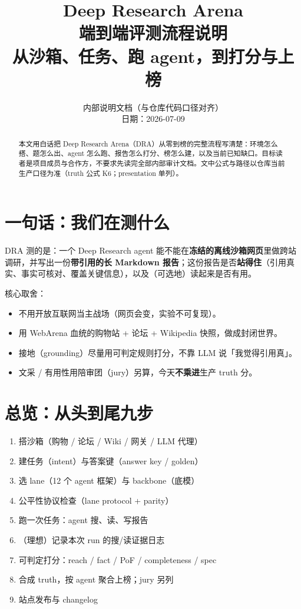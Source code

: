 \documentclass[11pt,a4paper]{article}
\title{\textbf{Deep Research Arena}\\[0.4em]
\large 端到端评测流程说明\\[0.3em]
\normalsize 从沙箱、任务、跑 agent，到打分与上榜}
\author{内部说明文档（与仓库代码口径对齐）\\日期：2026-07-09}
\date{}
\begin{document}
\maketitle
\tableofcontents
\newpage

\begin{abstract}
本文用白话把 Deep Research Arena（DRA）从零到榜的完整流程写清楚：环境怎么搭、题怎么出、agent 怎么跑、报告怎么打分、榜怎么建，以及当前已知缺口。目标读者是项目成员与合作方，不要求先读完全部内部审计文档。文中公式与路径以仓库当前生产口径为准（truth 公式 K6；presentation 单列）。
\end{abstract}

\section{一句话：我们在测什么}

DRA 测的是：一个 Deep Research agent 能不能在\textbf{冻结的离线沙箱网页}里做跨站调研，并写出一份\textbf{带引用的长 Markdown 报告}；这份报告是否\textbf{站得住}（引用真实、事实可核对、覆盖关键信息），以及（可选地）读起来是否有用。

核心取舍：
\begin{itemize}[leftmargin=1.5em]
  \item 不用开放互联网当主战场（网页会变，实验不可复现）。
  \item 用 WebArena 血统的购物站 + 论坛 + Wikipedia 快照，做成封闭世界。
  \item 接地（grounding）尽量用可判定规则打分，不靠 LLM 说「我觉得引用真」。
  \item 文采 / 有用性用陪审团（jury）另算，今天\textbf{不乘进}生产 truth 分。
\end{itemize}

\section{总览：从头到尾九步}

\begin{enumerate}[leftmargin=1.8em]
  \item 搭沙箱（购物 / 论坛 / Wiki / 网关 / LLM 代理）
  \item 建任务（intent）与答案键（answer key / golden）
  \item 选 lane（12 个 agent 框架）与 backbone（底模）
  \item 公平性协议检查（lane protocol + parity）
  \item 跑一次任务：agent 搜、读、写报告
  \item （理想）记录本次 run 的搜/读证据日志
  \item 可判定打分：reach / fact / PoF / completeness / spec
  \item 合成 truth，按 agent 聚合上榜；jury 另列
  \item 站点发布与 changelog
\end{enumerate}
\end{document}
